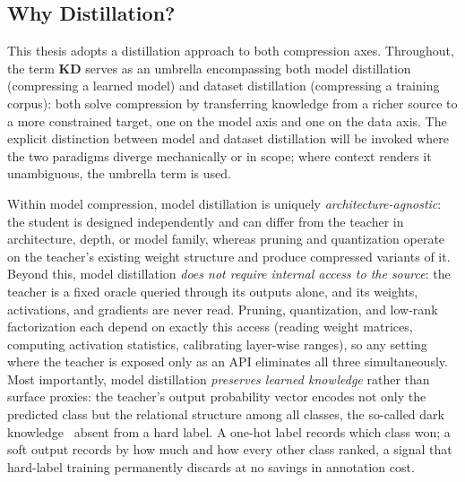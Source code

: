 \subsection{Why Distillation?} \label{sec:22-background-compression-whydistill}
\begin{foldable}
  This thesis adopts a distillation approach to both compression axes.
  Throughout, the term \textbf{\acl{KD}} serves as an umbrella encompassing both model distillation (compressing a learned model) and dataset distillation (compressing a training corpus): both solve compression by transferring knowledge from a richer source to a more constrained target, one on the model axis and one on the data axis.
  The explicit distinction between model and dataset distillation will be invoked where the two paradigms diverge mechanically or in scope; where context renders it unambiguous, the umbrella term is used.
\end{foldable}

\begin{foldable}
  Within model compression, model distillation is uniquely \textit{architecture-agnostic}: the student is designed independently and can differ from the teacher in architecture, depth, or model family, whereas pruning and quantization operate on the teacher's existing weight structure and produce compressed variants of it.
  Beyond this, model distillation \textit{does not require internal access to the source}: the teacher is a fixed oracle queried through its outputs alone, and its weights, activations, and gradients are never read.
  Pruning, quantization, and low-rank factorization each depend on exactly this access (reading weight matrices, computing activation statistics, calibrating layer-wise ranges), so any setting where the teacher is exposed only as an \ac{API} eliminates all three simultaneously.
  Most importantly, model distillation \textit{preserves learned knowledge} rather than surface proxies: the teacher's output probability vector encodes not only the predicted class but the relational structure among all classes, the so-called dark knowledge~\cite{hinton2015distilling} absent from a hard label.
  A one-hot label records which class won; a soft output records by how much and how every other class ranked, a signal that hard-label training permanently discards at no savings in annotation cost.
\end{foldable}

